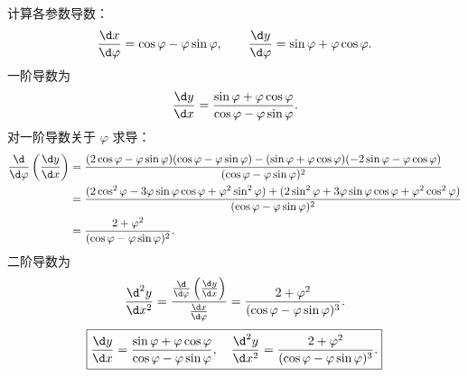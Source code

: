 \begin{solution}
    计算各参数导数：
    \begin{equation}
        \frac{\d x}{\d \varphi} = \cos \varphi - \varphi\sin\varphi, \qquad \frac{\d y}{\d \varphi} = \sin\varphi + \varphi\cos\varphi.
    \end{equation}
    一阶导数为
    \begin{equation}
        \frac{\d y}{\d x} = \frac{\sin\varphi + \varphi\cos\varphi}{\cos\varphi - \varphi\sin\varphi}.
    \end{equation}
    对一阶导数关于 $\varphi$ 求导：
    \begin{equation}
        \begin{aligned}
            \frac{\d}{\d \varphi}\left( \frac{\d y}{\d x} \right) & = \frac{(2\cos\varphi - \varphi\sin\varphi)(\cos\varphi - \varphi\sin\varphi) - (\sin\varphi + \varphi\cos\varphi)(-2\sin\varphi - \varphi\cos\varphi)}{(\cos\varphi - \varphi\sin\varphi)^2}          \\
                                                                  & = \frac{(2\cos^2\varphi - 3\varphi\sin\varphi\cos\varphi + \varphi^2\sin^2\varphi) + (2\sin^2\varphi + 3\varphi\sin\varphi\cos\varphi + \varphi^2\cos^2\varphi)}{(\cos\varphi - \varphi\sin\varphi)^2} \\
                                                                  & = \frac{2 + \varphi^2}{(\cos\varphi - \varphi\sin\varphi)^2}.
        \end{aligned}
    \end{equation}
    二阶导数为
    \begin{equation}
        \frac{\d^2 y}{\d x^2} = \frac{\frac{\d}{\d \varphi}\left( \frac{\d y}{\d x} \right)}{\frac{\d x}{\d \varphi}} = \frac{2+\varphi^2}{(\cos\varphi - \varphi\sin\varphi)^3}.
    \end{equation}
    \begin{equation}
        \boxed{\frac{\d y}{\d x} = \frac{\sin\varphi + \varphi\cos\varphi}{\cos\varphi - \varphi\sin\varphi}, \quad \frac{\d^2 y}{\d x^2} = \frac{2+\varphi^2}{(\cos\varphi - \varphi\sin\varphi)^3}.}
    \end{equation}



\end{solution}
